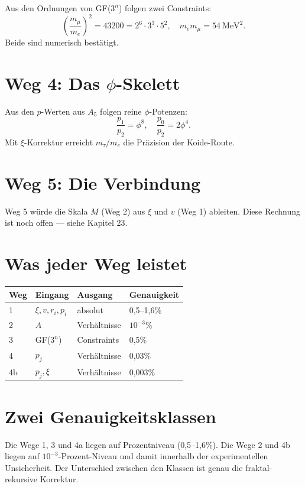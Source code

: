 \documentclass[12pt,oneside]{book}
\begin{document}
Aus den Ordnungen von GF($3^n$) folgen zwei Constraints:
\[
\left(\frac{m_\mu}{m_e}\right)^2 = 43200 = 2^6 \cdot 3^3 \cdot 5^2, \quad m_e m_\mu = 54~\text{MeV}^2.
\]
Beide sind numerisch bestätigt.

\section{Weg 4: Das $\phi$-Skelett}

Aus den $p$-Werten aus $A_5$ folgen reine $\phi$-Potenzen:
\[
\frac{p_1}{p_2} = \phi^8, \quad \frac{p_0}{p_2} = 2\phi^4.
\]
Mit $\xi$-Korrektur erreicht $m_\tau/m_e$ die Präzision der Koide-Route.

\section{Weg 5: Die Verbindung}

Weg 5 würde die Skala $M$ (Weg 2) aus $\xi$ und $v$ (Weg 1) ableiten. Diese Rechnung ist noch offen — siehe Kapitel 23.

\section{Was jeder Weg leistet}

\begin{center}
\begin{tabular}{llll}
\toprule
Weg & Eingang & Ausgang & Genauigkeit \\
\midrule
1 & $\xi, v, r_i, p_i$ & absolut & 0,5--1,6\% \\
2 & $A$ & Verhältnisse & $10^{-3}$\% \\
3 & GF($3^n$) & Constraints & 0,5\% \\
4 & $p_j$ & Verhältnisse & 0,03\% \\
4b & $p_j, \xi$ & Verhältnisse & 0,003\% \\
\bottomrule
\end{tabular}
\end{center}

\section{Zwei Genauigkeitsklassen}

Die Wege 1, 3 und 4a liegen auf Prozentniveau (0,5--1,6\%). Die Wege 2 und 4b liegen auf $10^{-3}$-Prozent-Niveau und damit innerhalb der experimentellen Unsicherheit. Der Unterschied zwischen den Klassen ist genau die fraktal-rekursive Korrektur.
\end{document}
